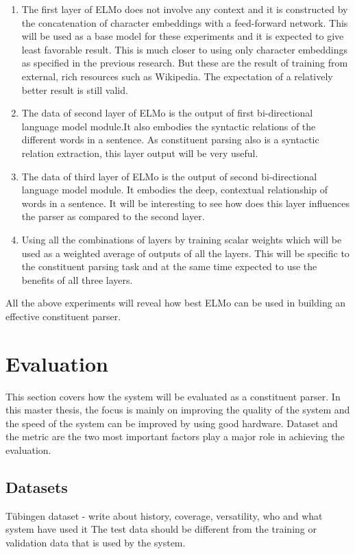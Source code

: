 \documentclass[a4paper, 11pt]{article}
\begin{document}
\begin{enumerate}
\item The first layer of ELMo does not involve any context and it is constructed by the concatenation of character embeddings with a feed-forward network. This will be used as a base model for these experiments and it is expected to give least favorable result. This is much closer to using only character embeddings as specified in the previous research. But these are the result of training from external, rich resources such as Wikipedia. The expectation of a relatively better result is still valid.
\item The data of second layer of ELMo is the output of first bi-directional language model module.It also embodies the syntactic relations of the different words in a sentence. As constituent parsing also is a syntactic relation extraction, this layer output will be very useful. 
\item The data of third layer of ELMo is the output of second bi-directional language model module. It embodies the deep, contextual relationship of words in a sentence. It will be interesting to see how does this layer influences the parser as compared to the second layer.   
\item Using all the combinations of layers by training scalar weights which will be used as a weighted average of outputs of all the layers. This will be specific to the constituent parsing task and at the same time expected to use the benefits of all three layers. 
\end{enumerate}

All the above experiments will reveal how best ELMo can be used in building an effective constituent parser. 


\pagebreak
\section{Evaluation}

This section covers how the system will be evaluated as a constituent parser. In this master thesis, the focus is mainly on improving the quality of the system and the speed of the system can be improved by using good hardware. Dataset and the metric are the two most important factors play a major role in achieving the evaluation. 
\subsection{Datasets}
Tübingen dataset - write about history, coverage, versatility, who and what system have used it 
The test data should be different from the training or validation data that is used by the system. 
\end{document}
